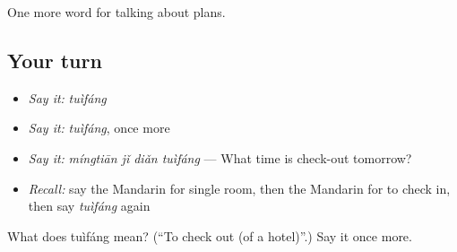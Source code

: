 \begin{grammarlens}[title={What you've built}]
One more word for talking about plans.
\end{grammarlens}

\subsection*{Your turn}
\begin{itemize}
\raggedright
  \item \emph{Say it:} \emph{tuìfáng}
  \item \emph{Say it:} \emph{tuìfáng}, once more
  \item \emph{Say it:} \emph{míngtiān jǐ diǎn tuìfáng} — What time is check-out tomorrow?
  \item \emph{Recall:} say the Mandarin for single room, then the Mandarin for to check in, then say \emph{tuìfáng} again
\end{itemize}

\begin{tcolorbox}[breakable,colback=teal!4,colframe=teal!35!black,title={Before you move on}]
What does tuìfáng mean? (\textquotedblleft{}To check out (of a hotel)\textquotedblright{}.) Say it once more.
\end{tcolorbox}

